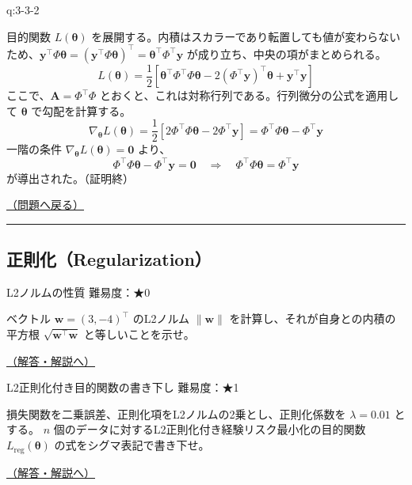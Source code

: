 \begin{answerbox}[phantomlabel=a:3-3-2]{q:3-3-2}

目的関数 \(L(\boldsymbol{\theta})\)
を展開する。内積はスカラーであり転置しても値が変わらないため、\(\mathbf{y}^\top \Phi \boldsymbol{\theta} = (\mathbf{y}^\top \Phi \boldsymbol{\theta})^\top = \boldsymbol{\theta}^\top \Phi^\top \mathbf{y}\)
が成り立ち、中央の項がまとめられる。 \[
L(\boldsymbol{\theta}) = \frac{1}{2} \left[ \boldsymbol{\theta}^\top \Phi^\top \Phi \boldsymbol{\theta} - 2 (\Phi^\top \mathbf{y})^\top \boldsymbol{\theta} + \mathbf{y}^\top \mathbf{y} \right]
\] ここで、\(\mathbf{A} = \Phi^\top \Phi\)
とおくと、これは対称行列である。行列微分の公式を適用して
\(\boldsymbol{\theta}\) で勾配を計算する。 \[
\nabla_{\boldsymbol{\theta}} L(\boldsymbol{\theta}) = \frac{1}{2} \left[ 2 \Phi^\top \Phi \boldsymbol{\theta} - 2 \Phi^\top \mathbf{y} \right] = \Phi^\top \Phi \boldsymbol{\theta} - \Phi^\top \mathbf{y}
\] 一階の条件
\(\nabla_{\boldsymbol{\theta}} L(\boldsymbol{\theta}) = \mathbf{0}\)
より、 \[
\Phi^\top \Phi \boldsymbol{\theta} - \Phi^\top \mathbf{y} = \mathbf{0} \quad \Rightarrow \quad \Phi^\top \Phi \boldsymbol{\theta} = \Phi^\top \mathbf{y}
\] が導出された。（証明終）

\hfill 

\hyperref[q:3-3-2]{（問題へ戻る）}

\begin{center}\rule{0.5\linewidth}{0.5pt}\end{center}

\end{answerbox}

\subsection{正則化（Regularization）}\label{ux6b63ux5247ux5316regularization}

\begin{questionbox}[label=q:3-4-1]{L2ノルムの性質 \hfill \normalfont \small 難易度：★0}

ベクトル \(\mathbf{w} = (3, -4)^\top\) のL2ノルム \(\|\mathbf{w}\|\)
を計算し、それが自身との内積の平方根
\(\sqrt{\mathbf{w}^\top \mathbf{w}}\) と等しいことを示せ。

\hfill 

\hyperref[a:3-4-1]{（解答・解説へ）}

\end{questionbox}

\begin{questionbox}[label=q:3-4-2]{L2正則化付き目的関数の書き下し \hfill \normalfont \small 難易度：★1}

損失関数を二乗誤差、正則化項をL2ノルムの2乗とし、正則化係数を
\(\lambda = 0.01\) とする。 \(n\)
個のデータに対するL2正則化付き経験リスク最小化の目的関数
\(L_{\text{reg}}(\boldsymbol{\theta})\) の式をシグマ表記で書き下せ。

\hfill 

\hyperref[a:3-4-2]{（解答・解説へ）}

\end{questionbox}

